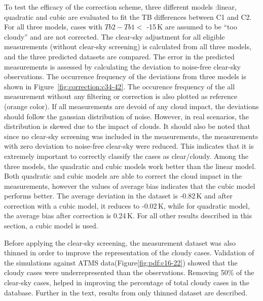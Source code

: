 \documentclass[12pt]{article}
\begin{document}
To test the efficacy of the correction scheme, three different models :linear, quadratic and cubic are evaluated to fit the TB differences between C1 and C2. For all three models, cases with $Tb2-Tb1 < $ -15\,K are assumed to be ``too cloudy'' and are not corrected.  The clear-sky adjustment for all eligible measurements (without clear-sky screening) is calculated from all three models, and the three predicted datasets are compared. The error in the predicted measurements is assessed by calculating the deviation to noise-free clear-sky observations. The occurrence frequency of the deviations from three models is shown in Figure~\ref{fig:correction:c34-42}. The occurence frequency of the all measurement without any filtering or correction is also plotted as reference (orange color). If all measurements are devoid of any cloud impact, the deviations should follow the gaussian distribution of noise. However, in real scenarios, the distribution is skewed due to the impact of clouds. It should also be noted that since no clear-sky screening was included in the measurements, the measurements with zero deviation to noise-free clear-sky were reduced. This indicates that it is extremely important to correctly classify the cases as clear/cloudy. Among the three models, the quadratic and cubic models work better than the linear model. Both quadratic and cubic models are able to correct the cloud impact in the measurements, however the values of average bias indicates that the cubic model performs better. The average deviation in the dataset is -0.82\,K and after correction with a cubic model, it reduces to -0.02\,K, while for quadratic model, the average bias after correction is 0.24\,K. For all other results described in this section, a cubic model is used.


Before applying the clear-sky screening, the measurement dataset was also thinned in order to improve the representation of the cloudy cases. Validation of the simulations against ATMS data(Figure\ref{fig:pdf:c16-22}) showed that the cloudy cases were underrepresented than the observations. Removing 50\% of the clear-sky cases, helped in improving the percentage of total cloudy cases in the database. Further in the text, results from only thinned dataset are described.
\end{document}
